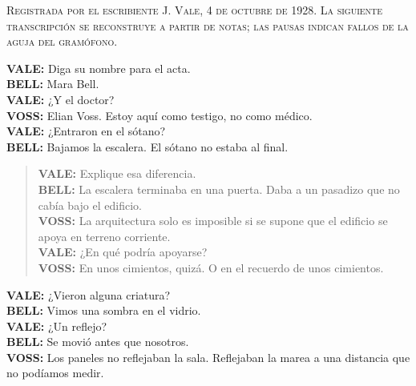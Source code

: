 \textsc{Registrada por el escribiente J. Vale, 4 de octubre de 1928. La
siguiente transcripción se reconstruye a partir de notas; las pausas
indican fallos de la aguja del gramófono.}

\medskip
\noindent\textbf{VALE:} Diga su nombre para el acta.\\
\textbf{BELL:} Mara Bell.\\
\textbf{VALE:} ¿Y el doctor?\\
\textbf{VOSS:} Elian Voss. Estoy aquí como testigo, no como médico.\\
\textbf{VALE:} ¿Entraron en el sótano?\\
\textbf{BELL:} Bajamos la escalera. El sótano no estaba al final.

\begin{quote}
\textbf{VALE:} Explique esa diferencia.\\
\textbf{BELL:} La escalera terminaba en una puerta. Daba a un pasadizo que
no cabía bajo el edificio.\\
\textbf{VOSS:} La arquitectura solo es imposible si se supone que el
edificio se apoya en terreno corriente.\\
\textbf{VALE:} ¿En qué podría apoyarse?\\
\textbf{VOSS:} En unos cimientos, quizá. O en el recuerdo de unos cimientos.
\end{quote}

\textbf{VALE:} ¿Vieron alguna criatura?\\
\textbf{BELL:} Vimos una sombra en el vidrio.\\
\textbf{VALE:} ¿Un reflejo?\\
\textbf{BELL:} Se movió antes que nosotros.\\
\textbf{VOSS:} Los paneles no reflejaban la sala. Reflejaban la marea a una
distancia que no podíamos medir.
